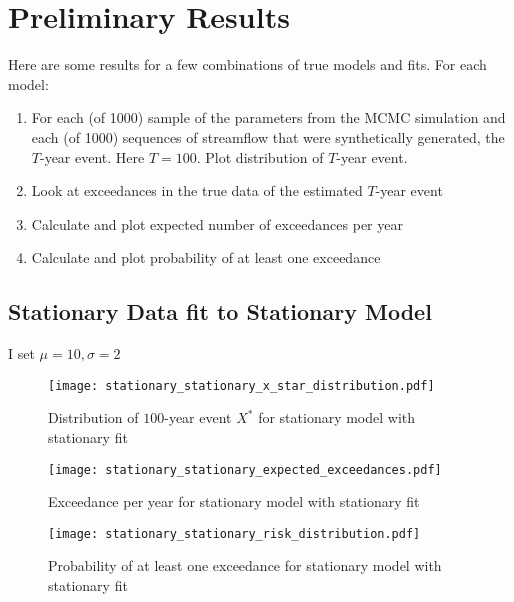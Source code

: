 
\section{Preliminary Results}

Here are some results for a few combinations of true models and fits.
For each model:
\begin{enumerate}
  \item For each (of 1000) sample of the parameters from the MCMC simulation and each (of 1000) sequences of streamflow that were synthetically generated, the $T$-year event. Here $T=100$. Plot distribution of $T$-year event.
  \item Look at exceedances in the true data of the estimated $T$-year event
  \item Calculate and plot expected number of exceedances per year
  \item Calculate and plot probability of at least one exceedance
\end{enumerate}

\subsection{Stationary Data fit to Stationary Model}
I set $\mu=10,\sigma=2$
\begin{figure}[ht]
  \centering
  \texttt{[image: stationary\_stationary\_x\_star\_distribution.pdf]}
  \caption{Distribution of $100$-year event $X^*$ for stationary model with stationary fit}
\end{figure}
\begin{figure}[ht]
  \centering
  \texttt{[image: stationary\_stationary\_expected\_exceedances.pdf]}
  \caption{Exceedance per year for stationary model with stationary fit}
\end{figure}
\begin{figure}[ht]
  \centering
  \texttt{[image: stationary\_stationary\_risk\_distribution.pdf]}
  \caption{Probability of at least one exceedance for stationary model with stationary fit}
\end{figure}

